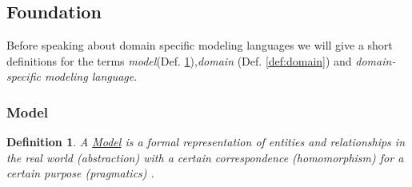 \documentclass[runningheads,a4paper]{llncs}
\newtheorem{defn}{Definition}
\begin{document}


\subsection{Foundation}
\label{subsec:introduction}
Before speaking about domain specific modeling languages we will give a short definitions for the  
terms \emph{model}(Def. \ref{def:model}),\emph{domain} (Def. \ref{def:domain}) and \emph{domain-specific modeling language}.

\subsubsection{Model}
% 
%  
%  
  \begin{defn}
    \label{def:model}
    A \underline{Model} is a formal representation of entities and relationships in the real world (abstraction) 
    with a certain correspondence (homomorphism) for a certain purpose (pragmatics) \cite{stachowiak1973allgemeine}.
  \end{defn}
  
\end{document}

